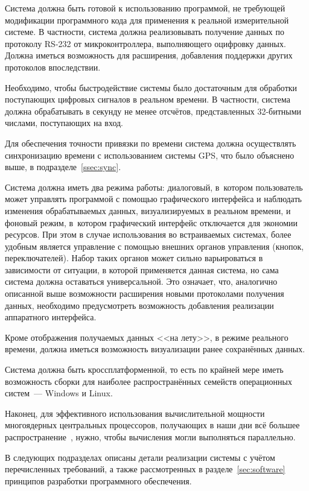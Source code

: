 \documentclass[a4paper, 14pt, titlepage]{extarticle}
\newcommand{\eng}[1]{\foreignlanguage{english}{#1}}
\begin{document}
  Система должна быть готовой к использованию программой, не требующей модификации программного кода
  для применения к реальной измерительной системе. В частности, система должна реализовывать
  получение данных по протоколу RS-232\cite{sweet-serial} от микроконтроллера, выполняющего оцифровку
  данных. Должна иметься возможность для расширения, добавления поддержки других протоколов впоследствии.

  Необходимо, чтобы быстродействие системы было достаточным для обработки поступающих цифровых
  сигналов в реальном времени. В частности, система должна обрабатывать в секунду не менее
   отсчётов, представленных 32-битными числами, поступающих на вход.

  Для обеспечения точности привязки по времени система должна осуществлять синхронизацию времени с
  использованием системы GPS, что было объяснено выше, в подразделе~\ref{ssec:sync}.

  Система должна иметь два режима работы: диалоговый, в~котором пользователь может управлять
  программой с помощью графического интерфейса и наблюдать изменения обрабатываемых данных,
  визуализируемых в реальном времени, и фоновый режим, в~котором графический интерфейс отключается
  для экономии ресурсов.
  При этом в случае использования во встраиваемых системах, более удобным является управление с
  помощью внешних органов управления (кнопок, переключателей). Набор таких органов может
  сильно варьироваться в зависимости от ситуации, в которой применяется данная система, но сама
  система должна оставаться универсальной. Это означает, что, аналогично описанной выше возможности
  расширения новыми протоколами получения данных, необходимо предусмотреть возможность добавления
  реализации аппаратного интерфейса.

  Кроме отображения получаемых данных <<на лету>>, в режиме реального времени, должна иметься
  возможность визуализации ранее сохранённых данных.

  Система должна быть кроссплатформенной, то есть по крайней мере иметь возможность сборки для
  наиболее распространённых семейств операционных систем~--- \eng{Windows} и \eng{Linux}.

  Наконец, для эффективного использования вычислительной мощности многоядерных центральных
  процессоров, получающих в наши дни всё большее распространение~\cite{steam-hardware}, нужно, чтобы
  вычисления могли выполняться параллельно.

  В следующих подразделах описаны детали реализации системы с учётом перечисленных требований, а
  также рассмотренных в разделе~\ref{sec:software} принципов разработки программного обеспечения.
\end{document}
